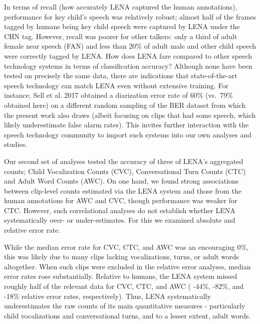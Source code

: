 \documentclass[english,floatsintext,man]{apa6}
\begin{document}
In terms of recall (how accurately LENA captured the human annotations),
performance for key child's speech was relatively robust; almost half of
the frames tagged by humans being key child speech were captured by LENA
under the CHN tag. However, recall was poorer for other talkers: only a
third of adult female near speech (FAN) and less than 20\% of adult male
and other child speech were correctly tagged by LENA. How does LENA fare
compared to other speech technology systems in terms of classification
accuracy? Although none have been tested on precisely the same data,
there are indications that state-of-the-art speech technology can match
LENA even without extensive training. For instance, Sell et al. 2017
obtained a diarization error rate of 60\% (vs.~79\% obtained here) on a
different random sampling of the BER dataset from which the present work
also draws (albeit focusing on clips that had some speech, which likely
underestimate false alarm rates). This invites further interaction with
the speech technology community to import such systems into our own
analyses and studies.

Our second set of analyses tested the accuracy of three of LENA's
aggregated counts; Child Vocalization Counts (CVC), Conversational Turn
Counts (CTC) and Adult Word Counts (AWC). On one hand, we found strong
associations between clip-level counts estimated via the LENA system and
those from the human annotations for AWC and CVC, though performance was
weaker for CTC. However, such correlational analyses do not establish
whether LENA systematically over- or under-estimates. For this we
examined absolute and relative error rate.

While the median error rate for CVC, CTC, and AWC was an encouraging
0\%, this was likely due to many clips lacking vocalizations, turns, or
adult words altogether. When such clips were excluded in the relative
error analyses, median error rates rose substantially. Relative to
humans, the LENA system missed roughly half of the relevant data for
CVC, CTC, and AWC ( -44\%, -82\%, and -18\% relative error rates,
respectively). Thus, LENA systematically underestimates the raw counts
of its main quantitative measures - particularly child vocalizations and
conversational turns, and to a lesser extent, adult words.
\end{document}
